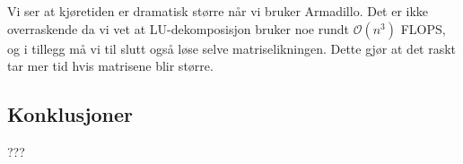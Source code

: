 \documentclass[11pt]{article}
\begin{document}
Vi ser at kjøretiden er dramatisk større når vi bruker Armadillo. Det
er ikke overraskende da vi vet at LU-dekomposisjon bruker noe rundt
$\mathcal{O}(n^3)$ FLOPS, og i tillegg må vi til slutt også løse selve
matriselikningen. Dette gjør at det raskt tar mer tid hvis matrisene
blir større.


\subsection{Konklusjoner}
??? 
\end{document}
